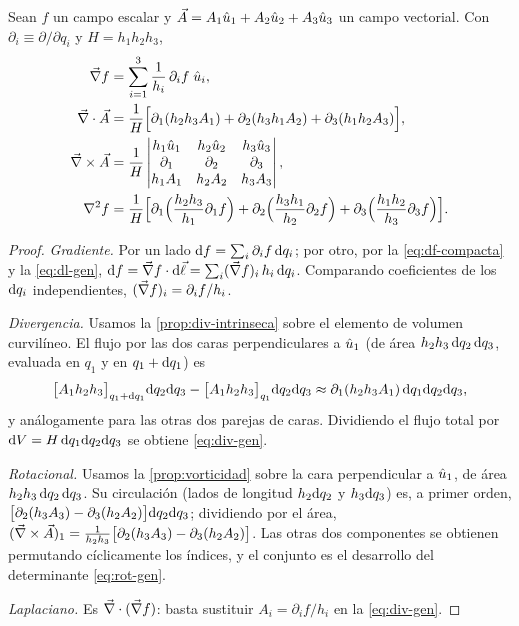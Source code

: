 \begin{teorema}\label{teo:operadores-ortogonales}
Sean $f$ un campo escalar y $\vec{A}=A_1\hat{u}_{1}+A_2\hat{u}_{2}+A_3\hat{u}_{3}$ un campo vectorial.
Con $\partial_i\equiv\partial/\partial q_i$ y $H=h_1h_2h_3$,
\begin{align}
  \vec{\nabla} f&=\sum_{i=1}^{3}\frac{1}{h_i}\,\partial_if\;\hat{u}_{i}, \label{eq:grad-gen}\\
  \vec{\nabla}\cdot\vec{A}&=\frac{1}{H}\Bigl[\partial_1(h_2h_3A_1)+\partial_2(h_3h_1A_2)+\partial_3(h_1h_2A_3)\Bigr], \label{eq:div-gen}\\
  \vec{\nabla}\times\vec{A}&=\frac{1}{H}
  \begin{vmatrix}
    h_1\hat{u}_{1} & h_2\hat{u}_{2} & h_3\hat{u}_{3}\\
    \partial_1 & \partial_2 & \partial_3\\
    h_1A_1 & h_2A_2 & h_3A_3
  \end{vmatrix}, \label{eq:rot-gen}\\
  \nabla^{2} f&=\frac{1}{H}\Bigl[\partial_1\Bigl(\frac{h_2h_3}{h_1}\partial_1f\Bigr)
     +\partial_2\Bigl(\frac{h_3h_1}{h_2}\partial_2f\Bigr)
     +\partial_3\Bigl(\frac{h_1h_2}{h_3}\partial_3f\Bigr)\Bigr]. \label{eq:lap-gen}
\end{align}
\end{teorema}
\begin{proof}
\emph{Gradiente.} Por un lado $\mathrm{d} f=\sum_i\partial_if\,\mathrm{d} q_i$; por otro, por
la \cref{eq:df-compacta} y la \cref{eq:dl-gen},
$\mathrm{d} f=\vec{\nabla} f\cdot\mathrm{d}\vec{\ell}=\sum_i(\vec{\nabla} f)_i\,h_i\,\mathrm{d} q_i$. Comparando coeficientes de los
$\mathrm{d} q_i$ independientes, $(\vec{\nabla} f)_i=\partial_if/h_i$.

\emph{Divergencia.} Usamos la \cref{prop:div-intrinseca} sobre el elemento de
volumen curvilíneo. El flujo por las dos caras perpendiculares a $\hat{u}_{1}$ (de
área $h_2h_3\,\mathrm{d} q_2\,\mathrm{d} q_3$, evaluada en $q_1$ y en $q_1+\mathrm{d} q_1$) es
\[
  \bigl[A_1h_2h_3\bigr]_{q_1+\mathrm{d} q_1}\mathrm{d} q_2\mathrm{d} q_3-\bigl[A_1h_2h_3\bigr]_{q_1}\mathrm{d} q_2\mathrm{d} q_3
  \approx\partial_1(h_2h_3A_1)\,\mathrm{d} q_1\mathrm{d} q_2\mathrm{d} q_3 ,
\]
y análogamente para las otras dos parejas de caras. Dividiendo el flujo total
por $\mathrm{d} V=H\,\mathrm{d} q_1\mathrm{d} q_2\mathrm{d} q_3$ se obtiene \eqref{eq:div-gen}.

\emph{Rotacional.} Usamos la \cref{prop:vorticidad} sobre la cara perpendicular a
$\hat{u}_{1}$, de área $h_2h_3\,\mathrm{d} q_2\,\mathrm{d} q_3$. Su circulación (lados de longitud
$h_2\mathrm{d} q_2$ y $h_3\mathrm{d} q_3$) es, a primer orden,
$\bigl[\partial_2(h_3A_3)-\partial_3(h_2A_2)\bigr]\mathrm{d} q_2\mathrm{d} q_3$; dividiendo por el
área, $(\vec{\nabla}\times\vec{A})_1=\tfrac{1}{h_2h_3}\bigl[\partial_2(h_3A_3)-\partial_3(h_2A_2)\bigr]$.
Las otras dos componentes se obtienen permutando cíclicamente los índices, y el
conjunto es el desarrollo del determinante \eqref{eq:rot-gen}.

\emph{Laplaciano.} Es $\vec{\nabla}\cdot(\vec{\nabla} f)$: basta sustituir $A_i=\partial_if/h_i$
en la \cref{eq:div-gen}.
\end{proof}

